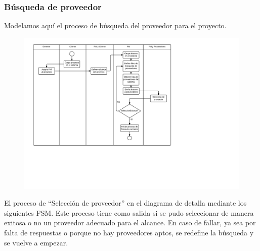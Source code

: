 		\subsubsection{Búsqueda de proveedor}
Modelamos aquí el proceso de búsqueda del proveedor para el proyecto. 
\begin{figure}[H]
\includegraphics[width=\linewidth]{diag/nuevos/act-busqprov.png}
\label{act-busqprov}
\end{figure}

El proceso de ``Selección de proveedor'' en el diagrama de detalla mediante 
los siguientes FSM. Este proceso tiene como salida si se pudo seleccionar de 
manera exitosa o no un proveedor adecuado para el alcance. En caso de fallar, ya sea 
por falta de respuestas o porque no hay proveedores aptos, se redefine la búsqueda y 
se vuelve a empezar. 

